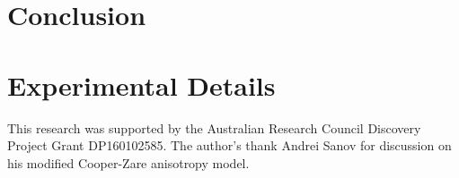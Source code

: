 \documentclass[journal=jacsat,manuscript=article,layout=twocolumn,12pt]{achemso}
\begin{document}
\section{Conclusion}

\section{Experimental Details}


\begin{acknowledgement}
	This research was supported by the Australian Research Council Discovery
	Project Grant DP160102585. The author's thank Andrei Sanov for discussion on his modified Cooper-Zare anisotropy model.
\end{acknowledgement}




\end{document}
